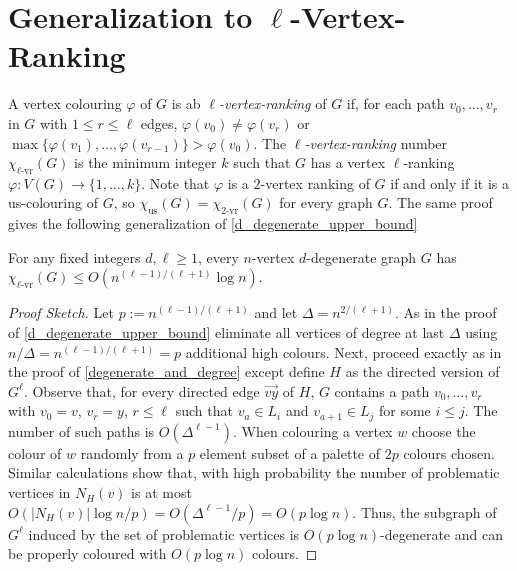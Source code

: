 \documentclass{patmorin}
\newcommand{\defin}[1]{\emph{\color{brightmaroon}#1}}
\newcommand{\rn}[1]{\chi_{\operatorname{#1-vr}}}
\newcommand{\trn}{\chi_{\mathrm{us}}}
\newcommand{\lrn}{\rn{\ell}}
\begin{document}
\section{Generalization to $\ell$-Vertex-Ranking}

A vertex colouring $\varphi$ of $G$ is ab \defin{$\ell$-vertex-ranking} of $G$ if, for each path $v_0,\ldots,v_r$ in $G$ with $1\le r\le\ell$ edges, $\varphi(v_0)\neq \varphi(v_r)$ or $\max\{\varphi(v_1),\ldots,\varphi(v_{r-1})\}>\varphi(v_0)$.  The \defin{$\ell$-vertex-ranking} number $\lrn(G)$ is the minimum integer $k$ such that $G$ has a vertex $\ell$-ranking $\varphi:V(G)\to\{1,\ldots,k\}$.  Note that $\varphi$ is a $2$-vertex ranking of $G$ if and only if it is a us-colouring of $G$, so $\trn(G)=\rn{2}(G)$ for every graph $G$.  The same proof gives the following generalization of \cref{d_degenerate_upper_bound}

\begin{thm}
  For any fixed integers $d,\ell\ge 1$, every $n$-vertex $d$-degenerate graph $G$ has $\lrn(G) \le O(n^{(\ell-1)/(\ell+1)}\log  n)$.
\end{thm}

\begin{proof}[Proof Sketch]
  Let $p:=n^{(\ell-1)/(\ell+1)}$ and let $\Delta=n^{2/(\ell+1)}$.  As in the proof of \cref{d_degenerate_upper_bound} eliminate all vertices of degree at last $\Delta$ using $n/\Delta = n^{(\ell-1)/(\ell+1)}=p$ additional high colours.  Next, proceed exactly as in the proof of \cref{degenerate_and_degree} except define $H$ as the directed version of $G^{\ell}$.  Observe that, for every directed edge $\overrightarrow{vy}$ of $H$, $G$ contains a path $v_0,\ldots,v_r$ with $v_0=v$, $v_r=y$, $r\le \ell$ such that $v_a\in L_i$ and $v_{a+1}\in L_j$ for some $i\le j$.  The number of such paths is $O(\Delta^{\ell-1})$. When colouring a vertex $w$ choose the colour of $w$ randomly from a $p$ element subset of a palette of $2p$ colours chosen.  Similar calculations show that, with high probability the number of problematic vertices in $N_H(v)$ is at most $O(|N_H(v)|\log n/p)=O(\Delta^{\ell-1}/p)=O(p\log n)$.  Thus, the subgraph of $G^\ell$ induced by the set of problematic vertices is $O(p\log n)$-degenerate and can be properly coloured with $O(p\log n)$ colours.
\end{proof}

\end{document}
